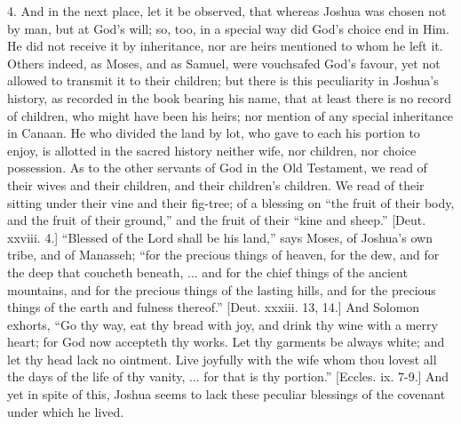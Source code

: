 4. And in the next place, let it be observed, that whereas Joshua
was chosen not by man, but at God's will; so, too, in a special way
did God's choice end in Him. He did not receive it by inheritance, nor
are heirs mentioned to whom he left it. Others indeed, as Moses, and
as Samuel, were vouchsafed God's favour, yet not allowed to transmit
it to their children; but there is this peculiarity in Joshua's
history, as recorded in the book bearing his name, that at least there
is no record of children, who might have been his heirs; nor mention
of any special inheritance in Canaan. He who divided the land by lot,
who gave to each his portion to enjoy, is allotted in the sacred
history neither wife, nor children, nor choice possession. As to the
other servants of God in the Old Testament, we read of their wives and
their children, and their children's children. We read of their
sitting under their vine and their fig-tree; of a blessing on
``the fruit of their body, and the fruit of their ground,''
and the fruit of their ``kine and sheep.'' [Deut. xxviii. 4.]
``Blessed of the Lord shall be his land,'' says Moses, of
Joshua's own tribe, and of Manasseh; ``for the precious things of
heaven, for the dew, and for the deep that coucheth beneath, ... and
for the chief things of the ancient mountains, and for the precious
things of the lasting hills, and for the precious things of the earth
and fulness thereof.'' [Deut. xxxiii. 13, 14.] And Solomon
exhorts, ``Go thy way, eat thy bread with joy, and drink thy wine
with a merry heart; for God now accepteth thy works. Let thy garments
be always white; and let thy head lack no ointment. Live joyfully with
the wife whom thou lovest all the days of the life of thy vanity, ...
for that is thy portion.'' [Eccles. ix. 7-9.] And yet in spite of
this, Joshua seems to lack these peculiar blessings of the covenant
under which he lived.

